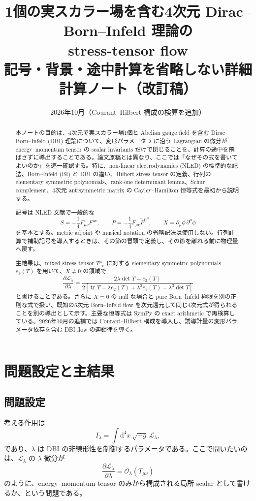 \documentclass[a4paper,11pt]{ltjsreport}
\title{1個の実スカラー場を含む4次元 Dirac--Born--Infeld 理論の\\
stress-tensor flow\\[2mm]
\large 記号・背景・途中計算を省略しない詳細計算ノート（改訂稿）}
\author{}
\date{2026年10月（Courant--Hilbert 構成の検算を追加）}
\newcommand{\tr}{\operatorname{tr}}
\newcommand{\dd}{\mathrm{d}}
\newcommand{\Lag}{\mathcal L}
\newcommand{\cO}{\mathcal O}
\begin{document}
\maketitle

\begin{abstract}
本ノートの目的は、4次元で実スカラー場1個と Abelian gauge field を含む Dirac--Born--Infeld (DBI) 理論について、変形パラメータ $\lambda$ に沿う Lagrangian の微分が energy--momentum tensor の scalar invariants だけで閉じることを、計算の途中を飛ばさずに導出することである。論文原稿とは異なり、ここでは「なぜその式を書いてよいのか」を逐一確認する。特に、non-linear electrodynamics (NLED) の標準的な記法、Born--Infeld (BI) と DBI の違い、Hilbert stress tensor の定義、行列の elementary symmetric polynomials、rank-one determinant lemma、Schur complement、4次元 antisymmetric matrix の Cayley--Hamilton 恒等式を最初から説明する。

記号は NLED 文献で一般的な
\[
 S=-\frac14F_{\mu\nu}F^{\mu\nu},\qquad
 P=-\frac14F_{\mu\nu}\widetilde F^{\mu\nu},\qquad
 X=\partial_\mu\phi\,\partial^\mu\phi
\]
を基本とする。metric adjoint や musical notation の省略記法は使用しない。行列計算で補助記号を導入するときは、その節の冒頭で定義し、その節を離れる前に物理量へ戻す。

主結果は、mixed stress tensor $T^\mu{}_{\nu}$ に対する elementary symmetric polynomials $e_k(T)$ を用いて、$X\neq0$ の領域で
\[
 \frac{\partial\Lag_\lambda}{\partial\lambda}
 =\frac{2\lambda\det T-e_3(T)}
 {2\left[\tr T-\lambda e_2(T)+\lambda^2e_3(T)-\lambda^3\det T\right]}
\]
と書けることである。さらに $X=0$ の null な場合と pure Born--Infeld 極限を別の正則な式で扱い、既知の5次元 Born--Infeld flow を次元還元して同じ4次元式が得られることを別の導出として示す。主要な恒等式は SymPy の exact arithmetic で再検算している。2026年10月の追補では Courant--Hilbert 構成を導入し、誘導計量の変形パラメータ依存を含む DBI flow の連鎖律を導く。
\end{abstract}

\tableofcontents
\clearpage

\chapter{問題設定と主結果}

\section{問題設定}

考える作用は
\begin{equation}
 I_\lambda=\int \dd^4x\,\sqrt{-g}\,\Lag_\lambda,
 \label{eq:action-general}
\end{equation}
であり、$\lambda$ は DBI の非線形性を制御するパラメータである。ここで問いたいのは、$\Lag_\lambda$ の $\lambda$ 微分が
\begin{equation}
 \frac{\partial\Lag_\lambda}{\partial\lambda}
 =\cO_\lambda(T_{\mu\nu})
 \label{eq:stress-flow-idea}
\end{equation}
のように、energy--momentum tensor のみから構成される局所 scalar として書けるか、という問題である。
\end{document}
